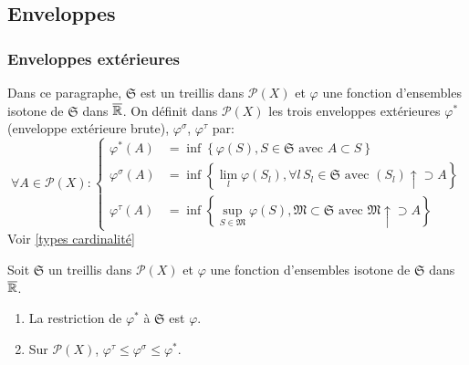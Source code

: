 \subsection{Enveloppes}\label{Enveloppes}
\subsubsection{Enveloppes extérieures}
Dans ce paragraphe, $\mathfrak{S}$ est un treillis dans $\mathcal{P}(X)$ et $\varphi$ une fonction d'ensembles isotone de $\mathfrak{S}$ dans $\overline{\mathbb{R}}$. On définit dans $\mathcal{P}(X)$ les trois enveloppes extérieures $\varphi^*$ (enveloppe extérieure brute), $\varphi^\sigma$, $\varphi^\tau$ par:
\begin{displaymath}
 \forall A \in  \mathcal{P}(X):
 \left\lbrace
 \begin{aligned}
    \varphi^*(A) &= \inf \left\lbrace \varphi(S), S \in \mathfrak{S} \text{ avec } A \subset S \right\rbrace \\
    \varphi^\sigma(A) &= \inf \left\lbrace \lim_{l}  \varphi(S_l), \forall l \, S_l\in \mathfrak{S} \text{ avec } (S_l) \uparrow \supset A \right\rbrace \\
    \varphi^\tau(A) &= \inf \left\lbrace \sup_{S \in \mathfrak{M}} \varphi(S), \mathfrak{M} \subset \mathfrak{S} \text{ avec } \mathfrak{M}\uparrow \supset A\right\rbrace
 \end{aligned}
 \right.
\end{displaymath}
Voir \ref{types cardinalité}
\begin{prop}
Soit $\mathfrak{S}$ un treillis dans $\mathcal{P}(X)$ et $\varphi$ une fonction d'ensembles isotone de $\mathfrak{S}$ dans $\overline{\mathbb{R}}$.
 \begin{enumerate}
  \item  La restriction de $\varphi^*$ à $\mathfrak{S}$ est $\varphi$.
  \item Sur $\mathcal{P}(X)$, $\varphi^\tau \leq \varphi^\sigma \leq \varphi^*$.
 \end{enumerate}
\end{prop}
